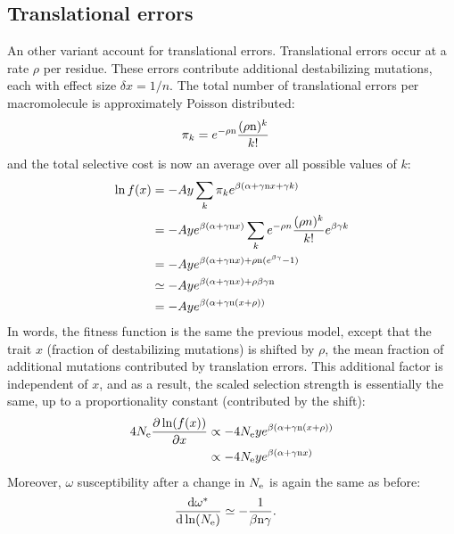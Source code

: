 \subsection{Translational errors}
An other variant account for translational errors. Translational errors occur at a rate $\rho$ per residue. These errors contribute additional destabilizing mutations, each with effect size $\delta x = 1/n$. The total number of translational errors per macromolecule is approximately Poisson distributed:
\begin{align}
\pi_k & = e^{-\rho \text{n}} \frac{(\rho \text{n})^k}{k!}
\end{align}
and the total selective cost is now an average over all possible values of $k$:
\begin{align}
\ln f(x) & = - A y \sum_k \pi_k e^{\beta(\alpha + \gamma\text{n} x + \gamma k)}
\\
& = - A y  e^{\beta(\alpha + \gamma\text{n} x)} \sum_k e^{-\rho n} \frac{(\rho n)^k}{k!} e^{\beta \gamma k}
\\
& = - A y  e^{\beta(\alpha + \gamma\text{n} x) + \rho \text{n} (e^{\beta \gamma} -1 )}
\\
& \simeq - A y  e^{\beta(\alpha + \gamma\text{n} x) + \rho \beta \gamma \text{n}}
\\
& =- A y  e^{\beta(\alpha + \gamma \text{n} (x + \rho))}
\end{align}
In words, the fitness function is the same the previous model, except that the trait $x$ (fraction of destabilizing mutations) is shifted by $\rho$, the mean fraction of additional mutations contributed by translation errors. This additional factor is independent of $x$, and as a result, the scaled selection strength is essentially the same, up to a proportionality constant (contributed by the shift):
\begin{align}
4 N_{\mathrm{e}} \frac{\partial \ln (f(x))}{\partial x} & \propto -4 N_{\mathrm{e}} y e^{\beta(\alpha + \gamma \text{n} (x + \rho))}
\\ & \propto -4 N_{\mathrm{e}} y e^{\beta(\alpha + \gamma\text{n} x)}
\end{align}
Moreover, $\omega$ susceptibility after a change in $N_{\mathrm{e}}$ is again the same as before:
\begin{align}
\frac{ \mathrm{d} \omega^{*}}{\mathrm{d} \ln (N_{\mathrm{e}})} & \simeq - \frac{1}{\beta \text{n} \gamma}.
\end{align}
